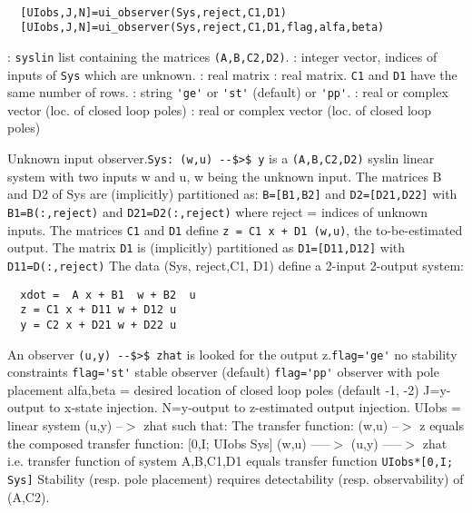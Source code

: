 \begin{mandesc}
   \\ %
\end{mandesc}
\begin{calling_sequence}
\begin{verbatim}
  [UIobs,J,N]=ui_observer(Sys,reject,C1,D1)  
  [UIobs,J,N]=ui_observer(Sys,reject,C1,D1,flag,alfa,beta)  
\end{verbatim}
\end{calling_sequence}
\begin{parameters}
  \begin{varlist}
    : \verb!syslin! list containing the matrices \verb!(A,B,C2,D2)!.
    : integer vector, indices of inputs of \verb!Sys! which are unknown.
    : real matrix
    : real matrix. \verb!C1! and \verb!D1! have the same number of rows.
    : string \verb!'ge'! or \verb!'st'! (default) or \verb!'pp'!.
    : real or complex vector (loc. of closed loop poles)
    : real or complex vector (loc. of closed loop poles)
  \end{varlist}
\end{parameters}
\begin{mandescription}
  Unknown input observer.\verb!Sys: (w,u) --$>$ y! is a \verb!(A,B,C2,D2)!
  syslin linear system with two inputs w and u, w being the unknown input.  The
  matrices B and D2 of Sys are (implicitly) partitioned as: \verb!B=[B1,B2]! and
  \verb!D2=[D21,D22]!  with \verb!B1=B(:,reject)!  and \verb!D21=D2(:,reject)!
  where reject = indices of unknown inputs.  The matrices \verb!C1! and
  \verb!D1! define \verb!z = C1 x + D1 (w,u)!, the to-be-estimated output.  The
  matrix \verb!D1! is (implicitly) partitioned as \verb!D1=[D11,D12]!  with
  \verb!D11=D(:,reject)!  The data (Sys, reject,C1, D1) define a 2-input
  2-output system:
\begin{verbatim}
  xdot =  A x + B1  w + B2  u
  z = C1 x + D11 w + D12 u
  y = C2 x + D21 w + D22 u
\end{verbatim}
An observer \verb!(u,y) --$>$ zhat! is looked for the output z.\verb!flag='ge'! no stability constraints
\verb!flag='st'! stable observer    (default) 
\verb!flag='pp'! observer with pole placement
alfa,beta = desired location of closed loop poles  (default -1, -2)
J=y-output to x-state injection.
N=y-output to z-estimated output injection.
UIobs = linear system (u,y) --$>$ zhat such that:
The transfer function: (w,u) --$>$ z  equals the composed transfer function:
[0,I;        UIobs
  Sys]
(w,u) -----$>$ (u,y) -----$>$ zhat
i.e. transfer function of system {A,B,C1,D1} equals transfer function 
\verb!UIobs*[0,I; Sys]!
Stability (resp. pole placement) requires detectability
(resp. observability) of (A,C2).
\end{mandescription}
